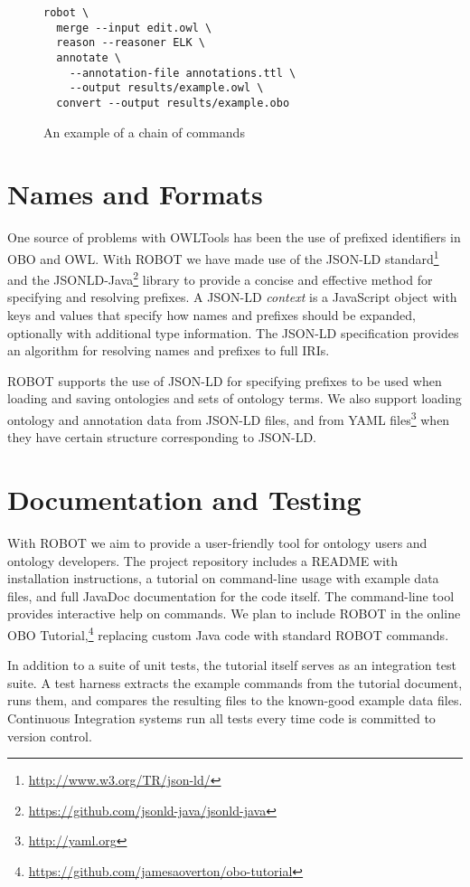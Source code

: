 \documentclass{icbo}
\begin{document}
\begin{figure}
\begin{verbatim}
robot \
  merge --input edit.owl \
  reason --reasoner ELK \
  annotate \
    --annotation-file annotations.ttl \
    --output results/example.owl \
  convert --output results/example.obo
\end{verbatim}
\caption{An example of a chain of commands}
\label{chain}
\end{figure}


\section{Names and Formats}

One source of problems with OWLTools has been the use of prefixed identifiers in OBO and OWL. With ROBOT we have made use of the JSON-LD standard\footnote{\url{http://www.w3.org/TR/json-ld/}} and the JSONLD-Java\footnote{\url{https://github.com/jsonld-java/jsonld-java}} library to provide a concise and effective method for specifying and resolving prefixes. A JSON-LD {\it context} is a JavaScript object with keys and values that specify how names and prefixes should be expanded, optionally with additional type information. The JSON-LD specification provides an algorithm for resolving names and prefixes to full IRIs.

ROBOT supports the use of JSON-LD for specifying prefixes to be used when loading and saving ontologies and sets of ontology terms. We also support loading ontology and annotation data from JSON-LD files, and from YAML files\footnote{\url{http://yaml.org}} when they have certain structure corresponding to JSON-LD.


\section{Documentation and Testing}

With ROBOT we aim to provide a user-friendly tool for ontology users and ontology developers. The project repository includes a README with installation instructions, a tutorial on command-line usage with example data files, and full JavaDoc documentation for the code itself. The command-line tool provides interactive help on commands. We plan to include ROBOT in the online OBO Tutorial,\footnote{\url{https://github.com/jamesaoverton/obo-tutorial}} replacing custom Java code with standard ROBOT commands.

In addition to a suite of unit tests, the tutorial itself serves as an integration test suite. A test harness extracts the example commands from the tutorial document, runs them, and compares the resulting files to the known-good example data files. Continuous Integration systems run all tests every time code is committed to version control.
\end{document}
